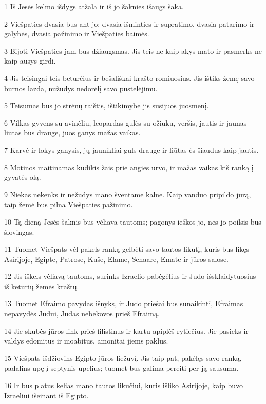 \par 1 Iš Jesės kelmo išdygs atžala ir iš jo šaknies išaugs šaka. 
\par 2 Viešpaties dvasia bus ant jo: dvasia išminties ir supratimo, dvasia patarimo ir galybės, dvasia pažinimo ir Viešpaties baimės. 
\par 3 Bijoti Viešpaties jam bus džiaugsmas. Jis teis ne kaip akys mato ir pasmerks ne kaip ausys girdi. 
\par 4 Jis teisingai teis beturčius ir bešališkai krašto romiuosius. Jis ištiks žemę savo burnos lazda, nužudys nedorėlį savo pūstelėjimu. 
\par 5 Teisumas bus jo strėnų raištis, ištikimybe jis susijuos juosmenį. 
\par 6 Vilkas gyvens su avinėliu, leopardas gulės su ožiuku, veršis, jautis ir jaunas liūtas bus drauge, juos ganys mažas vaikas. 
\par 7 Karvė ir lokys ganysis, jų jaunikliai guls drauge ir liūtas ės šiaudus kaip jautis. 
\par 8 Motinos maitinamas kūdikis žais prie angies urvo, ir mažas vaikas kiš ranką į gyvatės olą. 
\par 9 Niekas nekenks ir nežudys mano šventame kalne. Kaip vanduo pripildo jūrą, taip žemė bus pilna Viešpaties pažinimo. 
\par 10 Tą dieną Jesės šaknis bus vėliava tautoms; pagonys ieškos jo, nes jo poilsis bus šlovingas. 
\par 11 Tuomet Viešpats vėl pakels ranką gelbėti savo tautos likutį, kuris bus likęs Asirijoje, Egipte, Patrose, Kuše, Elame, Senaare, Emate ir jūros salose. 
\par 12 Jis iškels vėliavą tautoms, surinks Izraelio pabėgėlius ir Judo išsklaidytuosius iš keturių žemės kraštų. 
\par 13 Tuomet Efraimo pavydas išnyks, ir Judo priešai bus sunaikinti, Efraimas nepavydės Judui, Judas nebekovos prieš Efraimą. 
\par 14 Jie skubės jūros link prieš filistinus ir kartu apiplėš rytiečius. Jie pasieks ir valdys edomitus ir moabitus, amonitai jiems paklus. 
\par 15 Viešpats išdžiovins Egipto jūros liežuvį. Jis taip pat, pakėlęs savo ranką, padalins upę į septynis upelius; tuomet bus galima pereiti per ją sausuma. 
\par 16 Ir bus platus kelias mano tautos likučiui, kuris išliko Asirijoje, kaip buvo Izraeliui išeinant iš Egipto.



